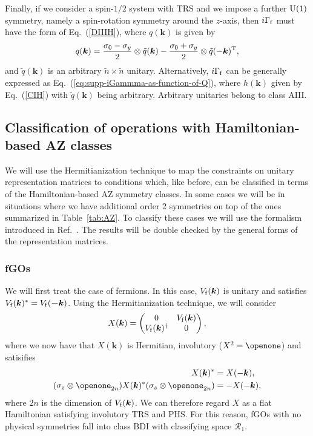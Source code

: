 \documentclass[prl,twocolumn,preprintnumbers,superscriptaddress,amsmath,amssymb]{revtex4-1}
\begin{document}
Finally, if we consider a spin-$1/2$ system with TRS and we impose a further ${\rm U}(1)$ symmetry, namely a spin-rotation symmetry around the $z$-axis, then $i\Gamma_{\rm f}$ must have the form of Eq.~(\ref{DIIIH}), where $q(\boldsymbol{k})$ is given by
\begin{equation}
q(\boldsymbol{k})=\frac{\sigma_0-\sigma_y}{2}\otimes\tilde q(\boldsymbol{k}) - \frac{\sigma_0+\sigma_y}{2}\otimes\tilde q(-\boldsymbol{k})^{\rm T},
\label{AIIIH}
\end{equation}
and $\tilde q(\boldsymbol{k})$ is an arbitrary $\tilde n\times \tilde n$ unitary. Alternatively, $i\Gamma_{\rm f}$ can be generally expressed as Eq.~(\ref{eq:supp-iGammma-as-function-of-Q}), where $h(\boldsymbol{k})$ given by Eq.~(\ref{CIH}) with $\tilde q(\boldsymbol{k})$ being arbitrary. Arbitrary unitaries belong to class AIII.


\subsection{Classification of operations with Hamiltonian-based AZ classes}
We will use the Hermitianization technique to map the constraints on unitary representation matrices to conditions which, like before, can be classified in terms of the Hamiltonian-based AZ symmetry classes. In some cases we will be in situations where we have additional order 2 symmetries on top of the ones summarized in Table~\ref{tab:AZ}. To classify these cases we will use the formalism introduced in Ref.~\cite{Shiozaki2014}. The results will be double checked by the general forms of the representation matrices.

\subsubsection{fGOs}
We will first treat the case of fermions. In this case, $V_{\rm f}(\boldsymbol{k})$ is unitary and satisfies $V_{\rm f}(\boldsymbol{k})^*=V_{\rm f}(\boldsymbol{-k})$. Using the Hermitianization technique, we will consider
\begin{equation}
    X(\boldsymbol{k})=\begin{pmatrix} 0 & V_{\rm f}(\boldsymbol{k}) \\ V_{\rm f}(\boldsymbol{k})^\dag & 0 \end{pmatrix},
    \label{eq:supp-hermitianization}
\end{equation}
where we now have that $X(\boldsymbol{k})$ is Hermitian, involutory ($X^2=\openone$) and satisifies
\begin{align}
     X(\boldsymbol{k})^* &= X(-\boldsymbol{k}), \\
     (\sigma_z \otimes \openone_{2n}) X(\boldsymbol{k})^* (\sigma_z \otimes \openone_{2n}) &= -X(-\boldsymbol{k}), \label{eq:supp-X-phs}
\end{align}
where $2n$ is the dimension of $V_{\rm f}(\boldsymbol{k})$. We can therefore regard $X$ as a flat Hamiltonian satisfying involutory TRS and PHS. For this reason, fGOs with no physical symmetries fall into class BDI with classifying space $\mathcal{R}_1$.
\end{document}
